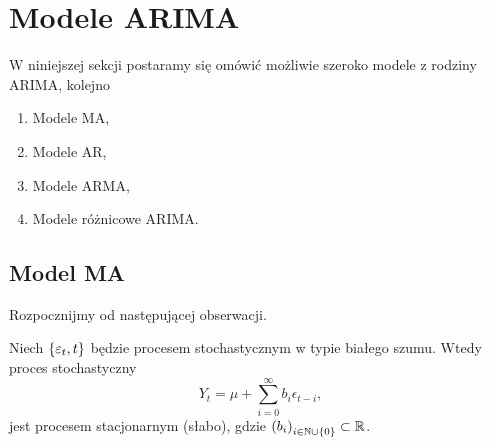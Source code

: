 \documentclass[10pt,a4paper]{book}
\begin{document}
\section{Modele ARIMA}

W niniejszej sekcji postaramy się omówić możliwie szeroko modele z rodziny ARIMA, kolejno
\begin{enumerate}
\item Modele MA,
\item Modele AR,
\item Modele ARMA,
\item Modele różnicowe ARIMA.
\end{enumerate}

\subsection{Model MA}

Rozpocznijmy od następującej obserwacji.

\begin{proposition} 
Niech $\left\lbrace {{\varepsilon_t}, {t}} \right\rbrace$ będzie procesem stochastycznym w typie białego szumu. Wtedy proces stochastyczny 
$$
Y_t = \mu + \sum_{i=0}^{\infty} b_i \epsilon_{t-i},
$$
jest procesem stacjonarnym (słabo), gdzie $\left( {b_i} \right)_{i \in \mathbb{N} \cup \left\lbrace {0} \right\rbrace }^{} \subset \mathbb{R} $. 
\end{proposition}
\end{document}

